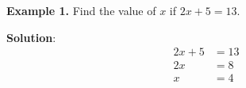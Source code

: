 \documentclass{article}
\newcommand{\solutionbox}[1]{
  \begin{framed}
    \setlength{\fboxrule}{2pt}
    \setlength{\fboxsep}{10pt}
    \setlength{\FrameSep}{20pt}
    \noindent\textbf{Solution}: #1
  \end{framed}
}
\begin{document}
\begin{flushleft}
\textbf{Example 1.} Find the value of $x$ if $2x + 5 = 13$.

\bigskip

\solutionbox{
  \begin{align*}
  2x + 5 &= 13 \\
  2x &= 8 \\
  x &= 4
  \end{align*}
}

\end{flushleft}
\end{document}
